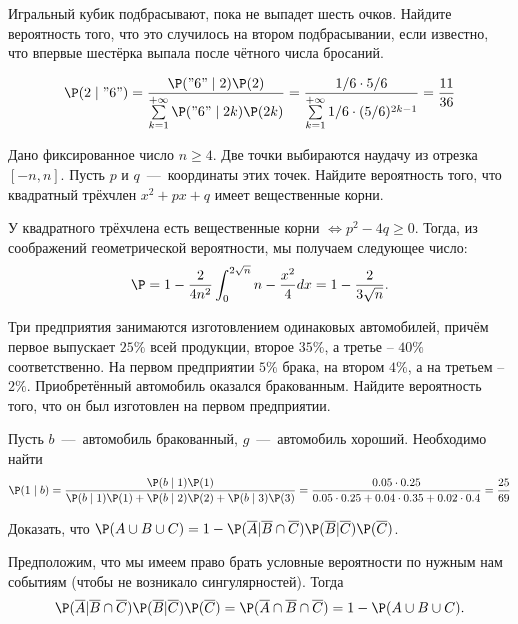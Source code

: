 \begin{problem}
    Игральный кубик подбрасывают, пока не выпадет шесть очков.
    Найдите вероятность того, что это случилось на втором подбрасывании, если известно, что впервые шестёрка выпала после чётного числа бросаний.
\end{problem}
\begin{solution}
    \[
        \P(2 \mid "6") = \dfrac{\P("6" \mid 2)\P(2)}{\sum\limits_{k = 1}^{+\infty} \P("6"\mid 2k) \P(2k)} = \dfrac{1/6 \cdot 5/6}{\sum\limits_{k = 1}^{+\infty} 1/6 \cdot (5/6)^{2k - 1}} = \dfrac{11}{36}
    \]
\end{solution}
\begin{problem}
    Дано фиксированное число $n \geq 4$.
    Две точки выбираются наудачу из отрезка $[-n, n]$.
    Пусть $p$ и $q$~---~координаты этих точек.
    Найдите вероятность того, что квадратный трёхчлен $x^2 + px + q$ имеет вещественные корни.
\end{problem}
\begin{solution}
    У квадратного трёхчлена есть вещественные корни $\Longleftrightarrow p^2 - 4q \geq 0$.
    Тогда, из соображений геометрической вероятности, мы получаем следующее число:
    \[
        \P = 1 - \dfrac{2}{4n^2}\int_0^{2\sqrt{n}}n - \dfrac{x^2}{4}dx = 1 - \dfrac{2}{3\sqrt {n}}.
    \]
\end{solution}
\begin{problem}
    Три предприятия занимаются изготовлением одинаковых автомобилей, причём первое выпускает $25\%$ всей продукции, второе $35\%$, а третье -- $40\%$ соответственно.
    На первом предприятии $5\%$ брака, на втором $4\%$, а на третьем -- $2\%$.
    Приобретённый автомобиль оказался бракованным.
    Найдите вероятность того, что он был изготовлен на первом предприятии.
\end{problem}
\begin{solution}
    Пусть $b$~---~автомобиль бракованный, $g$~---~автомобиль хороший.
    Необходимо найти
    \[
        \P(1\mid b) = \dfrac{\P(b \mid 1)\P(1)}{\P(b \mid 1)\P(1) + \P(b \mid 2)\P(2) + \P(b \mid 3)\P(3)} = \dfrac{0.05 \cdot 0.25}{0.05\cdot 0.25 + 0.04 \cdot 0.35 + 0.02 \cdot 0.4} = \dfrac{25}{69}
    \]
\end{solution}
\begin{problem}
    Доказать, что $\P(A \cup B \cup C) = 1 - \P(\overline{A}|\overline{B}\cap \overline{C})\P(\overline{B}|\overline{C})\P(\overline{C})$.
\end{problem}
\begin{solution}
    Предположим, что мы имеем право брать условные вероятности по нужным нам событиям (чтобы не возникало сингулярностей).
    Тогда
    \[
        \P(\overline{A}|\overline{B} \cap \overline{C})\P(\overline{B}|\overline{C})\P(\overline{C}) = \P(\overline{A}\cap \overline{B}\cap \overline{C}) = 1 - \P(A \cup B \cup C).
    \]
\end{solution}

